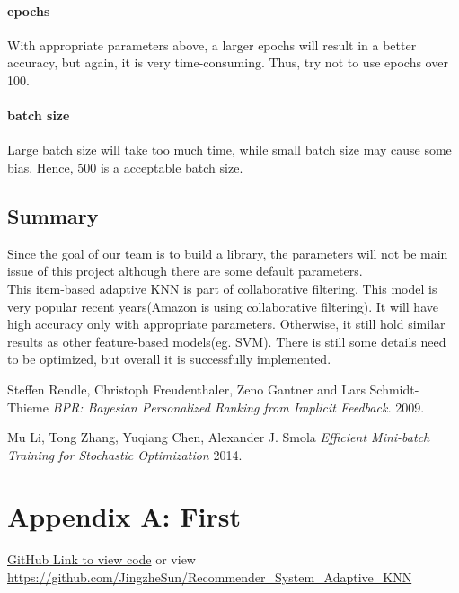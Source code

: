 \documentclass[paper=a4, fontsize=11pt, twocolumn]{scrartcl} %
\numberwithin{equation}{section} %
\numberwithin{figure}{section} %
\numberwithin{table}{section} %
\begin{document}
\paragraph{epochs} With appropriate parameters above, a larger epochs will result in a better accuracy, but again, it is very time-consuming. Thus, try not to use epochs over 100.

\paragraph{batch size} Large batch size will take too much time, while small batch size may cause some bias. Hence, 500 is a acceptable batch size.

\subsection{Summary}

Since the goal of our team is to build a library, the parameters will not be main issue of this project although there are some default parameters. \\
This item-based adaptive KNN is part of collaborative filtering. This model is very popular recent years(Amazon is using collaborative filtering). It will have high accuracy only with appropriate parameters. Otherwise, it still hold similar results as other feature-based models(eg. SVM). There is still some details need to be optimized, but overall it is successfully implemented. 

\begin{thebibliography}{12}

 Steffen Rendle, Christoph Freudenthaler, Zeno Gantner and Lars Schmidt-Thieme
 {\em BPR: Bayesian Personalized Ranking from Implicit Feedback.}
 {2009.}
 
 
 Mu Li, Tong Zhang, Yuqiang Chen, Alexander J. Smola
 {\em Efficient Mini-batch Training for Stochastic Optimization}
 {2014.}

\end{thebibliography}


\appendix      
\section*{Appendix A: First}
\href{https://github.com/JingzheSun/Recommender_System_Adaptive_KNN}{GitHub Link to view code} or view\\
\url{https://github.com/JingzheSun/Recommender_System_Adaptive_KNN}
\end{document}
